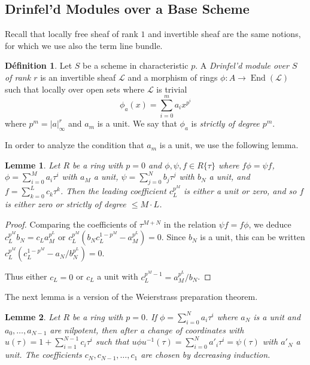 \documentclass[12pt,a4paper]{article}
\theoremstyle{plain}
\newtheorem{lemma}{Lemme}[section]
\theoremstyle{definition}
\newtheorem{definition}{D\'efinition}[section]
\theoremstyle{remark}
\DeclareMathOperator{\End}{End}
\newcommand{\cL}{\mathcal{L}}
\providecommand{\cL}{\mathcal{L}}
\providecommand{\End}{\operatorname{End}}
\begin{document}
\subsection{Drinfel'd Modules over a Base Scheme}
\label{sec:base}

Recall that locally free sheaf of rank $1$ and invertible sheaf are the same notions, for which we use also the term line bundle.

\begin{definition}
\label{def:scheme}
Let $S$ be a scheme in characteristic $p$. A \emph{Drinfel'd module over $S$ of rank $r$} is an invertible sheaf $\cL$ and a morphism of rings $\phi: A \to \End(\cL)$ such that locally over open sets where $\cL$ is trivial
\[
\phi_a(x) = \sum_{i=0}^{m} a_i x^{p^i}
\]
where $p^m = |a|_\infty^r$ and $a_m$ is a unit. We say that $\phi_a$ is \emph{strictly of degree $p^m$}.
\end{definition}

In order to analyze the condition that $a_m$ is a unit, we use the following lemma.

\begin{lemma}
\label{lem:unit}
Let $R$ be a ring with $p = 0$ and $\phi, \psi, f \in R\{\tau\}$ where $f\phi = \psi f$, $\phi = \sum_{i=0}^{M} a_i \tau^i$ with $a_M$ a unit, $\psi = \sum_{j=0}^{N} b_j \tau^j$ with $b_N$ a unit, and $f = \sum_{k=0}^{L} c_k \tau^k$. Then the leading coefficient $c_L^{p^M}$ is either a unit or zero, and so $f$ is either zero or strictly of degree $\leq M \cdot L$.
\end{lemma}

\begin{proof}
Comparing the coefficients of $\tau^{M+N}$ in the relation $\psi f = f \phi$, we deduce $c_L^{p^M} b_N = c_L a_M^{p^L}$ or $c_L^{p^M}(b_N c_L^{1-p^M} - a_M^{p^L}) = 0$. Since $b_N$ is a unit, this can be written $c_L^{p^M}(c_L^{1-p^M} - a_N/b_N^{p^L}) = 0$.

Thus either $c_L = 0$ or $c_L$ a unit with $c_L^{p^M-1} = a_M^{p^L}/b_N$.
\end{proof}

The next lemma is a version of the Weierstrass preparation theorem.

\begin{lemma}
\label{lem:weierstrass}
Let $R$ be a ring with $p = 0$. If $\phi = \sum_{i=0}^{N} a_i \tau^i$ where $a_N$ is a unit and $a_0, \ldots, a_{N-1}$ are nilpotent, then after a change of coordinates with $u(\tau) = 1 + \sum_{i=1}^{N-1} c_i \tau^i$ such that $u \phi u^{-1}(\tau) = \sum_{i=0}^{N} a'_i \tau^i = \psi(\tau)$ with $a'_N$ a unit. The coefficients $c_N, c_{N-1}, \ldots, c_1$ are chosen by decreasing induction.
\end{lemma}
\end{document}
